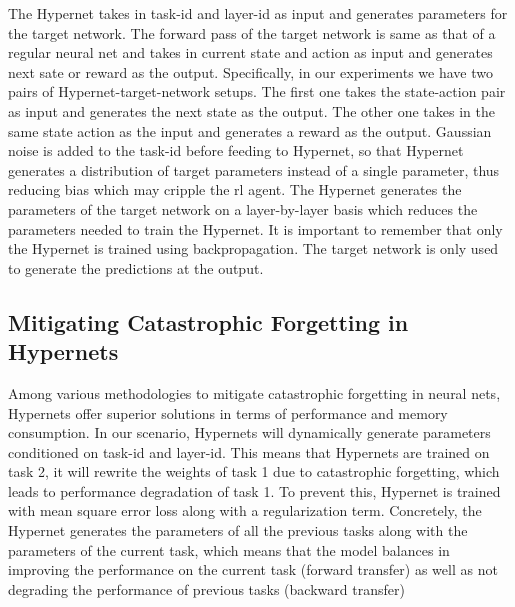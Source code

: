 \documentclass{article}
\begin{document}
The Hypernet takes in task-id and layer-id as input and generates parameters for the target network. The forward pass of the target network is same as that of a regular neural net and takes in current state and action as input and generates next sate or reward as the output.
Specifically, in our experiments we have two pairs of Hypernet-target-network setups. The first one takes the state-action pair as input and generates the next state as the output. 
The other one takes in the same state action as the input and generates a reward as the output.
Gaussian noise is added to the task-id before feeding to Hypernet, so that Hypernet generates a distribution of target parameters instead of a single parameter, thus reducing bias which may cripple the \gls{rl} agent.
The Hypernet generates the parameters of the target network on a layer-by-layer basis which reduces the parameters needed to train the Hypernet.
It is important to remember that only the Hypernet is trained using backpropagation. The target network is only used to generate the predictions at the output.

\subsection{Mitigating Catastrophic Forgetting in Hypernets}

Among various methodologies to mitigate catastrophic forgetting in neural nets, Hypernets \cite{Oswald} offer superior solutions in terms of performance and memory consumption. 
In our scenario, Hypernets will dynamically generate parameters conditioned on task-id and layer-id.
This means that Hypernets are trained on task 2, it will rewrite the weights of task 1 due to catastrophic forgetting, which leads to performance degradation of task 1. 
To prevent this, Hypernet is trained with mean square error loss along with a regularization term. Concretely, the Hypernet generates the parameters of all the previous tasks  along with the parameters of the current task, which means that the model balances in improving the performance on the current task (forward transfer) as well as not degrading the performance of previous tasks (backward transfer) 


\vspace{1em} %
\end{document}
